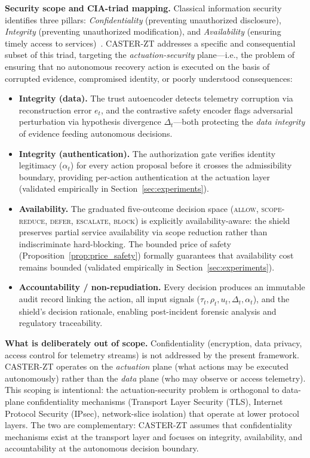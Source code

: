 \documentclass[10pt,journal,compsoc]{IEEEtran}
\begin{document}
\noindent\textbf{Security scope and CIA-triad mapping.}
Classical information security identifies three pillars: \emph{Confidentiality} (preventing unauthorized disclosure), \emph{Integrity} (preventing unauthorized modification), and \emph{Availability} (ensuring timely access to services)~\cite{rose2020nist}.
CASTER-ZT addresses a specific and consequential subset of this triad, targeting the \emph{actuation-security} plane---i.e., the problem of ensuring that no autonomous recovery action is executed on the basis of corrupted evidence, compromised identity, or poorly understood consequences:
\begin{itemize}
    \item \textbf{Integrity (data).}  The trust autoencoder detects telemetry corruption via reconstruction error $e_t$, and the contrastive safety encoder flags adversarial perturbation via hypothesis divergence $\Delta_t$---both protecting the \emph{data integrity} of evidence feeding autonomous decisions.
    \item \textbf{Integrity (authentication).}  The authorization gate verifies identity legitimacy ($\alpha_t$) for every action proposal before it crosses the admissibility boundary, providing per-action authentication at the actuation layer (validated empirically in Section~\ref{sec:experiments}).
    \item \textbf{Availability.}  The graduated five-outcome decision space (\textsc{allow}, \textsc{scope-reduce}, \textsc{defer}, \textsc{escalate}, \textsc{block}) is explicitly availability-aware: the shield preserves partial service availability via scope reduction rather than indiscriminate hard-blocking.  The bounded price of safety (Proposition~\ref{prop:price_safety}) formally guarantees that availability cost remains bounded (validated empirically in Section~\ref{sec:experiments}).
    \item \textbf{Accountability / non-repudiation.}  Every decision produces an immutable audit record linking the action, all input signals ($\tau_t, \rho_t, u_t, \Delta_t, \alpha_t$), and the shield's decision rationale, enabling post-incident forensic analysis and regulatory traceability.
\end{itemize}
\noindent\textbf{What is deliberately out of scope.}
Confidentiality (encryption, data privacy, access control for telemetry streams) is not addressed by the present framework.
CASTER-ZT operates on the \emph{actuation} plane (what actions may be executed autonomously) rather than the \emph{data} plane (who may observe or access telemetry).
This scoping is intentional: the actuation-security problem is orthogonal to data-plane confidentiality mechanisms (Transport Layer Security (TLS), Internet Protocol Security (IPsec), network-slice isolation) that operate at lower protocol layers.
The two are complementary: CASTER-ZT assumes that confidentiality mechanisms exist at the transport layer and focuses on integrity, availability, and accountability at the autonomous decision boundary.
\end{document}
